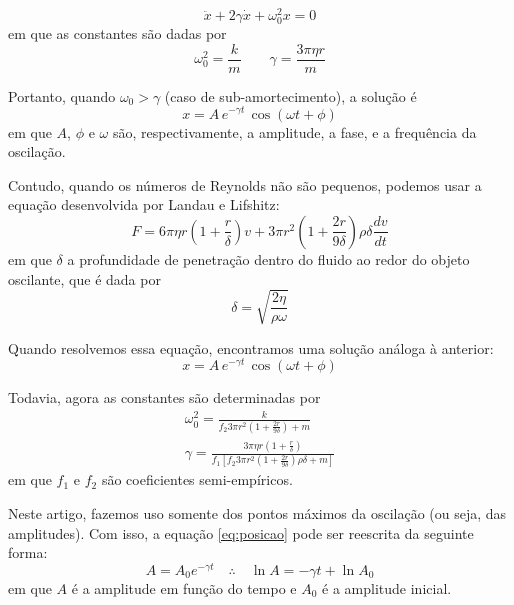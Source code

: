 \documentclass[a4paper, 12pt]{article}
\begin{document}
\begin{multicols}{2}
			\begin{equation}
				\ddot{x} + 2 \gamma \dot{x} + \omega_0^2 x = 0
			\end{equation}
			em que as constantes são dadas por
			\begin{equation}
				\omega_0^2 = \frac{k}{m} \qquad \gamma = \frac{3 \pi \eta r}{m}
			\end{equation}
			\par Portanto, quando $\omega_0 > \gamma$ (caso de sub-amortecimento), a solução é
			\begin{equation}
				x = A \, e^{- \gamma t} \, \cos (\omega t + \phi)
			\end{equation}
			em que $A$, $\phi$ e $\omega$ são, respectivamente, a amplitude, a fase, e a frequência da oscilação.
			\par Contudo, quando os números de Reynolds não são pequenos, podemos usar a equação desenvolvida por Landau e Lifshitz:
			\small \begin{equation} \label{eq:landau}
				F = 6 \pi \eta r \left(1 + \frac{r}{\delta} \right) v + 3 \pi r^2 \left( 1 + \frac{2 r}{9 \delta} \right) \rho \delta \dfrac{d v}{d t}
			\end{equation} \normalsize
			em que $\delta$ a profundidade de penetração dentro do fluido ao redor do objeto oscilante, que é dada por
			\begin{equation}
				\delta = \sqrt{\frac{2 \eta}{\rho \omega}}
			\end{equation}
			\par Quando resolvemos essa equação, encontramos uma solução análoga à anterior:
			\begin{equation} \label{eq:posicao}
				x = A \, e^{- \gamma t} \, \cos (\omega t + \phi)
			\end{equation}
			\par Todavia, agora as constantes são determinadas por
			\begin{equation} \label{eq:constantes} \begin{split}
				\omega_0^2 = \frac{k}{f_2 3 \pi r^2 \left(1 + \frac{2 r}{9 \delta} \right) + m} \\
				\gamma = \frac{3 \pi \eta r \left(1+ \frac{r}{\delta} \right)}{f_1 \left[ f_2 3 \pi r^2 \left(1+\frac{2 r}{9 \delta} \right) \rho \delta + m \right]}
			\end{split} \end{equation}
			em que $f_1$ e $f_2$ são coeficientes semi-empíricos.
			\par Neste artigo, fazemos uso somente dos pontos máximos da oscilação (ou seja, das amplitudes). Com isso, a equação \hyperref[eq:posicao]{\ref{eq:posicao}} pode ser reescrita da seguinte forma:
			\begin{equation}
				A = A_0 e^{- \gamma t} \quad \therefore \quad \ln A = - \gamma t + \ln A_0
			\end{equation}
			em que $A$ é a amplitude em função do tempo e $A_0$ é a amplitude inicial.
			

\end{multicols}
\end{document}

